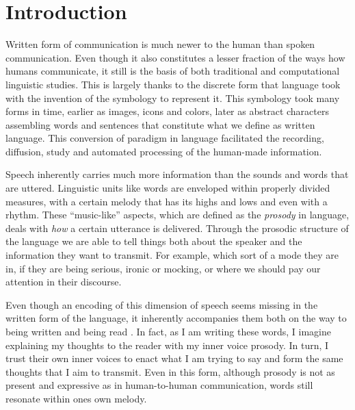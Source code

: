 \chapter{Introduction}
\label{chapter:intro}

Written form of communication is much newer to the human than spoken communication. Even though it also constitutes a lesser fraction of the ways how humans communicate, it still is the basis of both traditional and computational linguistic studies. This is largely thanks to the discrete form that language took with the invention of the symbology to represent it. This symbology took many forms in time, earlier as images, icons and colors, later as abstract characters assembling words and sentences that constitute what we define as written language. This conversion of paradigm in language facilitated the recording, diffusion, study and automated processing of the human-made information. 

Speech inherently carries much more information than the sounds and words that are uttered. Linguistic units like words are enveloped within properly divided measures, with a certain melody that has its highs and lows and even with a rhythm. These ``music-like'' aspects, which are defined as the \textit{prosody} in language, deals with \textit{how} a certain utterance is delivered. Through the prosodic structure of the language we are able to tell things both about the speaker and the information they want to transmit. For example, which sort of a mode they are in, if they are being serious, ironic or mocking, or where we should pay our attention in their discourse. 

Even though an encoding of this dimension of speech seems missing in the written form of the language, it inherently accompanies them both on the way to being written and being read \citep{wallace}. In fact, as I am writing these words, I imagine explaining my thoughts to the reader with my inner voice prosody. In turn, I trust their own inner voices to enact what I am trying to say and form the same thoughts that I aim to transmit. Even in this form, although prosody is not as present and expressive as in human-to-human communication, words still resonate within ones own melody. 

